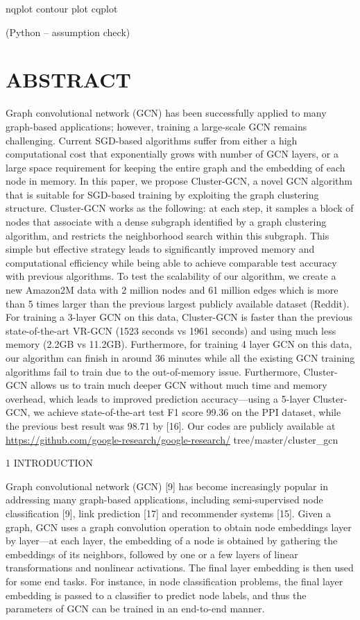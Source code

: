 \documentclass[
]{book}
\begin{document}
{{{nqplot
contour plot
cqplot

(Python -- assumption check)

\hypertarget{abstract-1}{%
\chapter{ABSTRACT}\label{abstract-1}}

Graph convolutional network (GCN) has been successfully applied to many graph-based applications; however, training a large-scale GCN remains challenging. Current SGD-based algorithms suffer from either a high computational cost that exponentially grows with number of GCN layers, or a large space requirement for keeping the entire graph and the embedding of each node in memory. In this paper, we propose Cluster-GCN, a novel GCN algorithm that is suitable for SGD-based training by exploiting the graph clustering structure. Cluster-GCN works as the following: at each step, it samples a block of nodes that associate with a dense subgraph identified by a graph clustering algorithm, and restricts the neighborhood search within this subgraph. This simple but effective strategy leads to significantly improved memory and computational efficiency while being able to achieve comparable test accuracy with previous algorithms. To test the scalability of our algorithm, we create a new Amazon2M data with 2 million nodes and 61 million edges which is more than 5 times larger than the previous largest publicly available dataset (Reddit). For training a 3-layer GCN on this data, Cluster-GCN is faster than the previous state-of-the-art VR-GCN (1523 seconds vs 1961 seconds) and using much less memory (2.2GB vs 11.2GB). Furthermore, for training 4 layer GCN on this data, our algorithm can finish in around 36 minutes while all the existing GCN training algorithms fail to train due to the out-of-memory issue. Furthermore, Cluster-GCN allows us to train much deeper GCN without much time and memory overhead, which leads to improved prediction accuracy---using a 5-layer Cluster-GCN, we achieve state-of-the-art test F1 score 99.36 on the PPI dataset, while the previous best result was 98.71 by {[}16{]}. Our codes are publicly available at \url{https://github.com/google-research/google-research/} tree/master/cluster\_gcn

1 INTRODUCTION

Graph convolutional network (GCN) {[}9{]} has become increasingly popular in addressing many graph-based applications, including semi-supervised node classification {[}9{]}, link prediction {[}17{]} and recommender systems {[}15{]}. Given a graph, GCN uses a graph convolution operation to obtain node embeddings layer by layer---at each layer, the embedding of a node is obtained by gathering the embeddings of its neighbors, followed by one or a few layers of linear transformations and nonlinear activations. The final layer embedding is then used for some end tasks. For instance, in node classification problems, the final layer embedding is passed to a classifier to predict node labels, and thus the parameters of GCN can be trained in an end-to-end manner.

}}}
\end{document}
